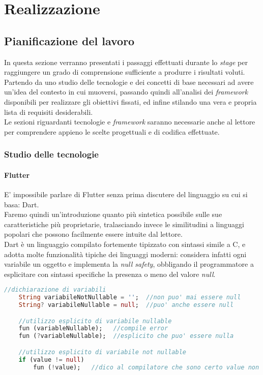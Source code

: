 
\chapter{Realizzazione}
\label{cap:realizzazione}

\section{Pianificazione del lavoro}
In questa sezione verranno presentati i passaggi effettuati durante lo \textit{stage} per raggiungere un grado di comprensione sufficiente a produrre i risultati voluti. Partendo da uno studio delle tecnologie e dei concetti di base necessari ad avere un'idea del contesto in cui muoversi, passando quindi all'analisi dei \textit{framework} disponibili per realizzare gli obiettivi fissati, ed infine stilando una vera e propria lista di requisiti desiderabili.\\
Le sezioni riguardanti tecnologie e \textit{framework} saranno necessarie anche al lettore per comprendere appieno le scelte progettuali e di codifica effettuate.

\subsection{Studio delle tecnologie}
\subsubsection{Flutter}
E' impossibile parlare di Flutter senza prima discutere del linguaggio su cui si basa: Dart.\\
Faremo quindi un'introduzione quanto più sintetica possibile sulle sue caratteristiche più proprietarie, tralasciando invece le similitudini a linguaggi popolari che possono facilmente essere intuite dal lettore.\\
Dart è un linguaggio compilato fortemente tipizzato con sintassi simile a C, e adotta molte funzionalità tipiche dei linguaggi moderni: considera infatti ogni variabile un oggetto e implementa la \textit{null safety}, obbligando il programmatore a esplicitare con sintassi specifiche la presenza o meno del valore \textit{null}.

\begin{lstlisting}[language=dart, firstnumber=1,caption={Dart \textit{null safety}}]
    //dichiarazione di variabili
    String variabileNotNullable = '';  //non puo' mai essere null
    String? variabileNullable = null;  //puo' anche essere null

    //utilizzo esplicito di variabile nullable
    fun (variableNullable);   //compile error
    fun (?variableNullable);  //esplicito che puo' essere nulla

    //utilizzo esplicito di variabile not nullable
    if (value != null)
        fun (!value);   //dico al compilatore che sono certo value non sia null
\end{lstlisting} 

